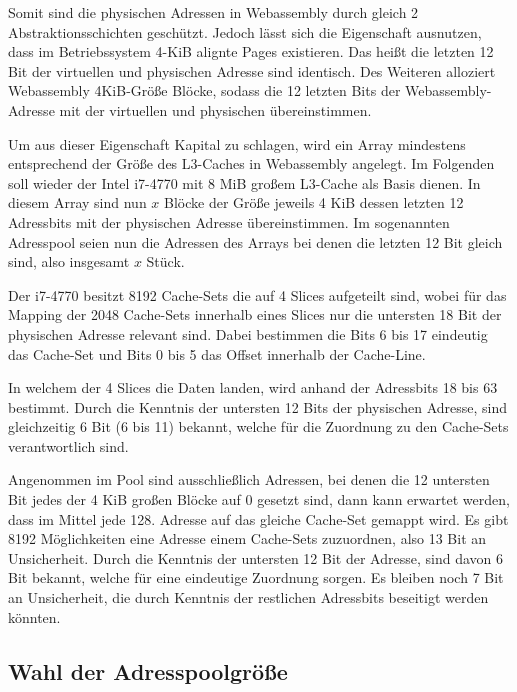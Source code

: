 Somit sind die physischen Adressen in Webassembly durch gleich 2 Abstraktionsschichten geschützt. 
Jedoch lässt sich die Eigenschaft ausnutzen, dass im Betriebssystem 4-KiB alignte Pages existieren. 
Das heißt die letzten 12 Bit der virtuellen und physischen Adresse sind identisch. 
Des Weiteren alloziert Webassembly 4KiB-Größe Blöcke, sodass die 12 letzten Bits der Webassembly-Adresse mit der virtuellen und physischen übereinstimmen.

Um aus dieser Eigenschaft Kapital zu schlagen, wird ein Array mindestens entsprechend der Größe des L3-Caches in Webassembly angelegt. Im Folgenden soll wieder der Intel i7-4770 mit 8 MiB großem L3-Cache als Basis dienen. In diesem Array sind nun $x$ Blöcke der Größe jeweils 4 KiB dessen letzten 12 Adressbits mit der physischen Adresse übereinstimmen. Im sogenannten Adresspool seien nun die Adressen des Arrays bei denen die letzten 12 Bit gleich sind, also insgesamt $x$ Stück.

Der i7-4770 besitzt 8192 Cache-Sets die auf 4 Slices aufgeteilt sind, wobei für das Mapping der 2048 Cache-Sets innerhalb eines Slices nur die untersten 18 Bit der physischen Adresse relevant sind. Dabei bestimmen die Bits 6 bis 17 eindeutig das Cache-Set und Bits 0 bis 5 das Offset innerhalb der Cache-Line.

In welchem der 4 Slices die Daten landen, wird anhand der Adressbits 18 bis 63 bestimmt.
Durch die Kenntnis der untersten 12 Bits der physischen Adresse, sind gleichzeitig 6 Bit (6 bis 11) bekannt, welche für die Zuordnung zu den Cache-Sets verantwortlich sind.

Angenommen im Pool sind ausschließlich Adressen, bei denen die 12 untersten Bit jedes der 4 KiB großen Blöcke auf 0 gesetzt sind, dann kann erwartet werden, dass im Mittel jede 128. 
Adresse auf das gleiche Cache-Set gemappt wird. Es gibt 8192 Möglichkeiten eine Adresse einem Cache-Sets zuzuordnen, also 13 Bit an Unsicherheit.
Durch die Kenntnis der untersten 12 Bit der Adresse, sind davon 6 Bit bekannt, welche für eine eindeutige Zuordnung sorgen. 
Es bleiben noch 7 Bit an Unsicherheit, die durch Kenntnis der restlichen Adressbits beseitigt werden könnten.

\subsection{Wahl der Adresspoolgröße}

